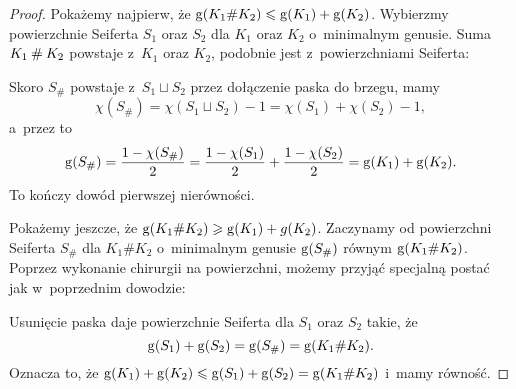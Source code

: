 \begin{proof}
    Pokażemy najpierw, że $\operatorname{g} (K_1 \# K_2) \leqslant \operatorname{g} (K_1) + \operatorname{g} (K_2)$.
    Wybierzmy powierzchnie Seiferta $S_1$ oraz $S_2$ dla $K_1$ oraz $K_2$ o~minimalnym genusie.
    Suma $K_1 \mathbin{\#} K_2$ powstaje z~$K_1$ oraz $K_2$, podobnie jest z~powierzchniami Seiferta:
\begin{comment}
    \begin{figure}[H]
        \centering
        \begin{minipage}[b]{.48\linewidth}
        \[
            \LargeGenusProofA \longrightarrow \LargeGenusProofB
        \]
        \subcaption{suma węzłów}
        \end{minipage}
        \begin{minipage}[b]{.48\linewidth}
        \[
            \LargeGenusProofC \longrightarrow \LargeGenusProofD
        \]
        \subcaption{suma powierzchni}
        \end{minipage}
    \end{figure}
\end{comment}
    Skoro $S_{\#}$ powstaje z~$S_1 \sqcup S_2$ przez dołączenie paska do brzegu, mamy
    \begin{equation}
        \chi(S_{\#}) = \chi(S_1 \sqcup S_2) - 1 = \chi(S_1) + \chi(S_2)-1,
    \end{equation}
    a~przez to
    \begin{equation}
        \operatorname{g} (S_{\#}) = \frac{1-\chi(S_{\#})}{2} =
        \frac{1-\chi(S_1)}{2} + \frac{1-\chi(S_2)}{2}
        = \operatorname{g}(K_1) + \operatorname{g}(K_2).
    \end{equation}
    To kończy dowód pierwszej nierówności.

    Pokażemy jeszcze, że $\operatorname{g} (K_1 \# K_2) \geqslant \operatorname{g} (K_1) + g(K_2)$.
    Zaczynamy od powierzchni Seiferta $S_{\#}$ dla $K_1 \# K_2$ o~minimalnym genusie $\operatorname{g} (S_{\#})$ równym $\operatorname{g} (K_1 \# K_2)$.
    Poprzez wykonanie chirurgii na powierzchni, możemy przyjąć specjalną postać jak w~poprzednim dowodzie:
\begin{comment}
    \[
        \LargeGenusProofD
    \]
\end{comment}
    Usunięcie paska daje powierzchnie Seiferta dla $S_1$ oraz $S_2$ takie, że
    \begin{equation}
        \operatorname{g}(S_1) + \operatorname{g}(S_2) = \operatorname{g}(S_{\#}) = \operatorname{g}(K_1 \# K_2).
    \end{equation}
    Oznacza to, że $\operatorname{g}(K_1) + \operatorname{g}(K_2) \leqslant \operatorname{g}(S_1) + \operatorname{g}(S_2) = \operatorname{g}(K_1 \# K_2)$ i~mamy równość.
\end{proof}

